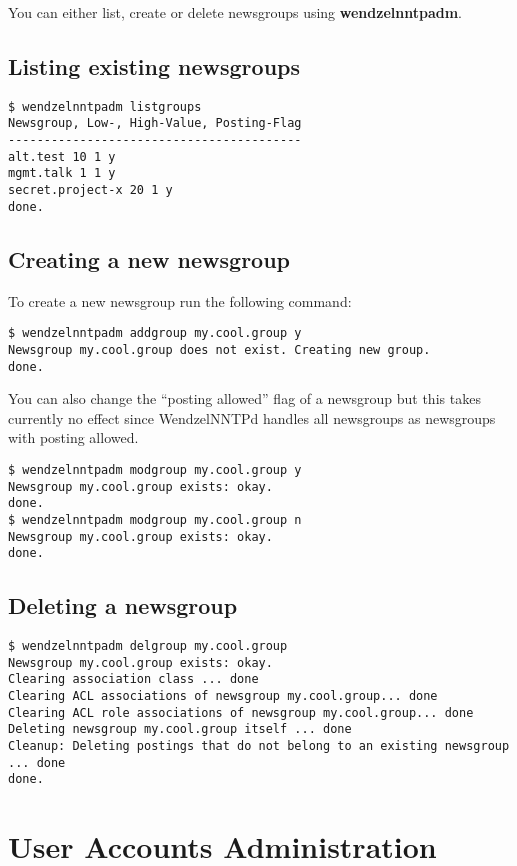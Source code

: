 You can either list, create or delete newsgroups using {\bf wendzelnntpadm}.

\subsection{Listing existing newsgroups}

\begin{verbatim}
$ wendzelnntpadm listgroups
Newsgroup, Low-, High-Value, Posting-Flag
-----------------------------------------
alt.test 10 1 y
mgmt.talk 1 1 y
secret.project-x 20 1 y
done.
\end{verbatim}

\subsection{Creating a new newsgroup}

To create a new newsgroup run the following command:

\begin{verbatim}
$ wendzelnntpadm addgroup my.cool.group y
Newsgroup my.cool.group does not exist. Creating new group.
done.
\end{verbatim}

You can also change the ``posting allowed'' flag of a newsgroup but this takes currently no effect since WendzelNNTPd handles all newsgroups as newsgroups with posting allowed.

\begin{verbatim}
$ wendzelnntpadm modgroup my.cool.group y
Newsgroup my.cool.group exists: okay.
done.
$ wendzelnntpadm modgroup my.cool.group n
Newsgroup my.cool.group exists: okay.
done.
\end{verbatim}

\subsection{Deleting a newsgroup}

\begin{verbatim}
$ wendzelnntpadm delgroup my.cool.group
Newsgroup my.cool.group exists: okay.
Clearing association class ... done
Clearing ACL associations of newsgroup my.cool.group... done
Clearing ACL role associations of newsgroup my.cool.group... done
Deleting newsgroup my.cool.group itself ... done
Cleanup: Deleting postings that do not belong to an existing newsgroup ... done
done.
\end{verbatim}

\section{User Accounts Administration}

